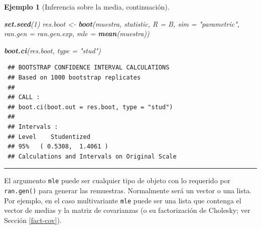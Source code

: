 \documentclass[
  spanish,
  10pt,
]{book}
\newenvironment{Shaded}{\begin{snugshade}}{\end{snugshade}}
\newcommand{\AttributeTok}[1]{\textcolor[rgb]{0.13,0.29,0.53}{#1}}
\newcommand{\DecValTok}[1]{\textcolor[rgb]{0.00,0.00,0.81}{#1}}
\newcommand{\FunctionTok}[1]{\textcolor[rgb]{0.13,0.29,0.53}{\textbf{#1}}}
\newcommand{\NormalTok}[1]{#1}
\newcommand{\OtherTok}[1]{\textcolor[rgb]{0.56,0.35,0.01}{#1}}
\newcommand{\StringTok}[1]{\textcolor[rgb]{0.31,0.60,0.02}{#1}}
\theoremstyle{break}
\newtheorem{example}{Ejemplo}[chapter]
\theoremstyle{nonumberplain}
\begin{document}
\begin{example}[Inferencia sobre la media, continuación]
\begin{Shaded}
\begin{Highlighting}[]
\FunctionTok{set.seed}\NormalTok{(}\DecValTok{1}\NormalTok{)}
\NormalTok{res.boot }\OtherTok{\textless{}{-}} \FunctionTok{boot}\NormalTok{(muestra, statistic, }\AttributeTok{R =}\NormalTok{ B, }\AttributeTok{sim =} \StringTok{"parametric"}\NormalTok{,}
                 \AttributeTok{ran.gen =}\NormalTok{ ran.gen.exp, }\AttributeTok{mle =} \FunctionTok{mean}\NormalTok{(muestra))}

\FunctionTok{boot.ci}\NormalTok{(res.boot, }\AttributeTok{type =} \StringTok{"stud"}\NormalTok{)}
\end{Highlighting}
\end{Shaded}

\begin{verbatim}
 ## BOOTSTRAP CONFIDENCE INTERVAL CALCULATIONS
 ## Based on 1000 bootstrap replicates
 ## 
 ## CALL : 
 ## boot.ci(boot.out = res.boot, type = "stud")
 ## 
 ## Intervals : 
 ## Level    Studentized     
 ## 95%   ( 0.5308,  1.4061 )  
 ## Calculations and Intervals on Original Scale
\end{verbatim}

\end{example}

\begin{center}\rule{0.5\linewidth}{0.5pt}\end{center}

El argumento \texttt{mle} puede ser cualquier tipo de objeto con lo requerido por \texttt{ran.gen()} para generar las remuestras.
Normalmente será un vector o una lista.
Por ejemplo, en el caso multivariante \texttt{mle} puede ser una lista que contenga el vector de medias y la matriz de covarianzas (o su factorización de Cholesky; ver Sección \ref{fact-cov}).
\end{document}
